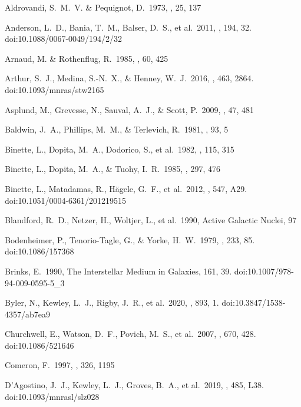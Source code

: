 \documentclass[twocolumn]{aastex62}
\begin{document}
\begin{CJK*}{UTF8}{gbsn}
\begin{thebibliography}{}
 Aldrovandi, S.~M.~V. \& Pequignot, D.\ 1973, \aap, 25, 137

 Anderson, L.~D., Bania, T.~M., Balser, D.~S., et al.\ 2011, \apjs, 194, 32. doi:10.1088/0067-0049/194/2/32

 Arnaud, M. \& Rothenflug, R.\ 1985, \aaps, 60, 425

 Arthur, S.~J., Medina, S.-N.~X., \& Henney, W.~J.\ 2016, \mnras, 463, 2864. doi:10.1093/mnras/stw2165

 Asplund, M., Grevesse, N., Sauval, A.~J., \& Scott, P.\ 2009, \araa, 47, 481

 Baldwin, J.~A., Phillips, M.~M., \& Terlevich, R.\ 1981, \pasp, 93, 5 

 Binette, L., Dopita, M.~A., Dodorico, S., et al.\ 1982, \aap, 115, 315

 Binette, L., Dopita, M.~A., \& Tuohy, I.~R.\ 1985, \apj, 297, 476

 Binette, L., Matadamas, R., H{\"a}gele, G.~F., et al.\ 2012, \aap, 547, A29. doi:10.1051/0004-6361/201219515

 Blandford, R.~D., Netzer, H., Woltjer, L., et al.\ 1990, Active Galactic Nuclei, 97

 Bodenheimer, P., Tenorio-Tagle, G., \& Yorke, H.~W.\ 1979, \apj, 233, 85. doi:10.1086/157368

 Brinks, E.\ 1990, The Interstellar Medium in Galaxies, 161, 39. doi:10.1007/978-94-009-0595-5\_3

 Byler, N., Kewley, L.~J., Rigby, J.~R., et al.\ 2020, \apj, 893, 1. doi:10.3847/1538-4357/ab7ea9

 Churchwell, E., Watson, D.~F., Povich, M.~S., et al.\ 2007, \apj, 670, 428. doi:10.1086/521646

 Comeron, F.\ 1997, \aap, 326, 1195

 D'Agostino, J.~J., Kewley, L.~J., Groves, B.~A., et al.\ 2019, \mnras, 485, L38. doi:10.1093/mnrasl/slz028


\end{thebibliography}
\end{CJK*}
\end{document}
